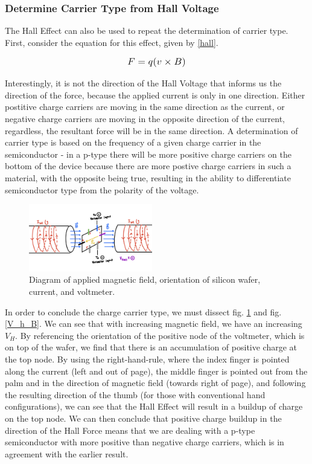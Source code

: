 \documentclass[aps,prl,reprint]{revtex4-2}
\begin{document}
\subsubsection{Determine Carrier Type from Hall Voltage}

The Hall Effect can also be used to repeat the determination of carrier type. First, consider the
equation for this effect, given by \ref{hall}.


\begin{equation}
	\mathlarger{F = q (v \times B)}
    \label{hall}
\end{equation}

Interestingly, it is not the direction of the Hall Voltage that informs us the direction of the
force, because the applied current is only in one direction. Either postitive charge carriers are
moving in the same direction as the current, or negative charge carriers are moving in the 
opposite direction of the current, regardless, the resultant force will be in the same 
direction. A determination of carrier type is based on the frequency of a given charge carrier
in the semiconductor - in a p-type there will be more positive charge carriers on the bottom of
the device because there are more postive charge carriers in such a material, with the opposite
being true, resulting in the ability to differentiate semiconductor type from the polarity of the 
voltage. \\

\begin{figure}[h]
	\begin{center}
		\includegraphics[width=0.48\textwidth]{../Images/l2_Magnet.jpg}
	\end{center}
	\caption{\label{magnet} Diagram of applied magnetic field, orientation of silicon wafer,
		current, and voltmeter.}
\end{figure}

In order to conclude the charge carrier type, we must dissect fig. \ref{magnet} and fig. 
\ref{V_h_B}. We can see that with increasing magnetic field, we have an increasing $V_H$. 
By referencing the orientation of the positive node of the voltmeter, which is on top of the
wafer, we find that there is an accumulation of positive charge at the top node. By using the
right-hand-rule, where the index finger is pointed along the current (left and out of page), 
the middle finger is pointed out from the palm and in the direction of magnetic field (towards
right of page), and following the resulting direction of the thumb (for those with conventional
hand configurations), we can see that the Hall Effect will result in a buildup of charge on the 
top node. We can then conclude that positive charge buildup in the direction of the Hall Force
means that we are dealing with a p-type semiconductor with more positive than negative charge 
carriers, which is in agreement with the earlier result.
\end{document}
